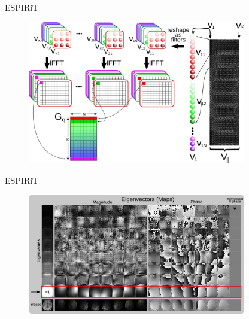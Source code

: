 \documentclass[aspectratio=169]{beamer}
\begin{document}
	\begin{frame}{ESPIRiT}
		\begin{figure}
			\centering
			\includegraphics[width=0.85\textwidth]{figures/mrm24751-fig-0003-m.jpg}
		\end{figure}
	\end{frame}
	
	\begin{frame}{ESPIRiT}
		\begin{figure}
			\centering
			\includegraphics[width=0.85\textwidth]{figures/mrm24751-fig-0004-m.jpg}
		\end{figure}
	\end{frame}
	
\end{document}
